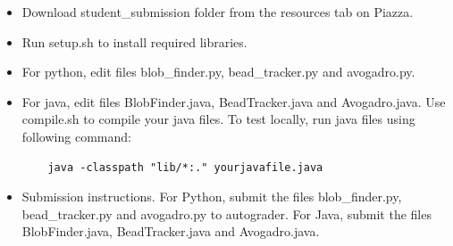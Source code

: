 \documentclass[]{article}
\begin{document}
\begin{itemize}

\item Download student\_submission folder from the resources tab on Piazza.

\item Run setup.sh to install required libraries.

\item For python, edit files blob\_finder.py, bead\_tracker.py and avogadro.py. 

\item For java, edit files BlobFinder.java, BeadTracker.java and Avogadro.java. Use compile.sh to compile your java files. To test locally, run java files using following command:

\begin{lstlisting}
    java -classpath "lib/*:." yourjavafile.java
\end{lstlisting}

\item Submission instructions. For Python, submit the files blob\_finder.py, bead\_tracker.py and avogadro.py to autograder. For Java, submit the files BlobFinder.java, BeadTracker.java and Avogadro.java.

\end{itemize}




\end{document}
